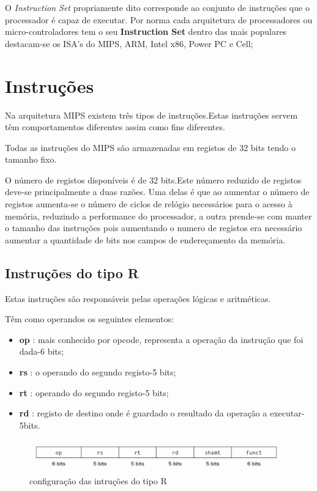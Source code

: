 \documentclass[10pt,a4paper]{book}
\begin{document}
	O \textit{Instruction Set} propriamente dito corresponde ao conjunto de instruções que o processador é capaz de executar.
	Por norma cada arquitetura de processadores ou micro-controladores tem o seu \textbf{Instruction Set} dentro das mais populares destacam-se os ISA's do MIPS, ARM, Intel x86, Power PC e Cell;


	\section{Instruções}

	Na arquitetura MIPS existem três tipos de instruções.Estas instruções servem têm comportamentos diferentes assim como fins diferentes.

	Todas as instruções do MIPS são armazenadas em registos de 32 bits tendo o tamanho fixo.

	O número de registos disponíveis é de 32 bits.Este número reduzido de registos deve-se principalmente a duas razões. Uma delas é que ao aumentar o número de registos aumenta-se o número de
	ciclos de relógio necessários para o acesso à memória, reduzindo a performance do processador, a outra prende-se com manter o tamanho das instruções pois aumentando o numero de registos era necessário
	aumentar a quantidade de bits nos campos de endereçamento da memória.

	\subsection{Instruções do tipo R}

	Estas instruções são responsáveis pelas operações lógicas e aritméticas.

	Têm como operandos os seguintes elementos:
	 \begin{itemize}
	 	\item \textbf{op} : mais conhecido por opcode, representa a operação da instrução que foi dada-6 bits;
	 	\item \textbf{rs} : o operando do segundo registo-5 bits;
	 	\item \textbf{rt} : operando do segundo registo-5 bits;
	 	\item \textbf{rd} : registo de destino onde é guardado o resultado da operação a executar-5bits.
	 \end{itemize}


	\begin{figure}[htp]
	    \centering
	    \includegraphics[scale=0.4]{fig1.png}
	    \caption{configuração das intruções do tipo R}
	    \label{insturçãor}
	\end{figure}
\end{document}
